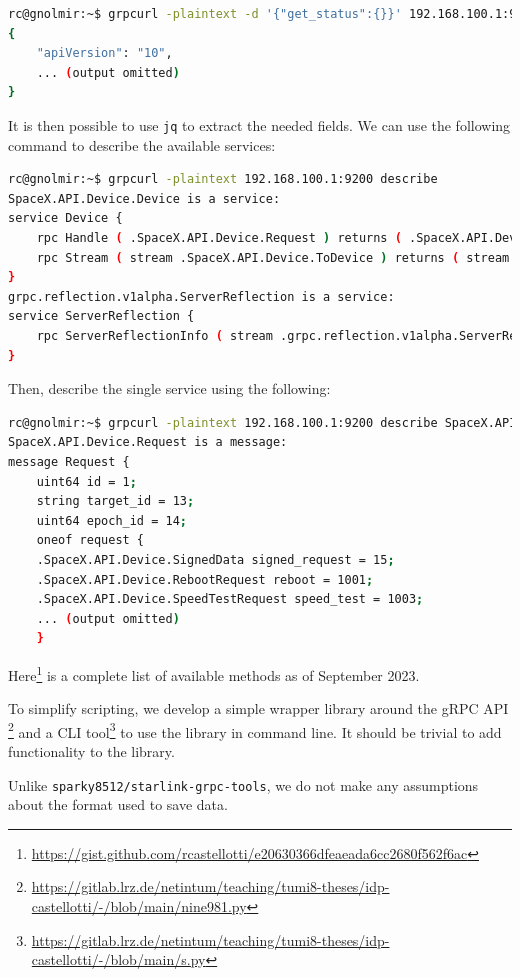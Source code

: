\documentclass[IN,11pt,twoside,openright,idp,english]{tumthesis}
\begin{document}
\begin{lstlisting}[language=bash]
rc@gnolmir:~$ grpcurl -plaintext -d '{"get_status":{}}' 192.168.100.1:9200 SpaceX.API.Device.Device/Handle
{
    "apiVersion": "10",
    ... (output omitted)
}
\end{lstlisting}

It is then possible to use \texttt{jq} to extract the needed fields. We can use the following command to describe the available services:
    
\begin{lstlisting}[language=bash]
rc@gnolmir:~$ grpcurl -plaintext 192.168.100.1:9200 describe
SpaceX.API.Device.Device is a service:
service Device {
    rpc Handle ( .SpaceX.API.Device.Request ) returns ( .SpaceX.API.Device.Response );
    rpc Stream ( stream .SpaceX.API.Device.ToDevice ) returns ( stream .SpaceX.API.Device.FromDevice );
}
grpc.reflection.v1alpha.ServerReflection is a service:
service ServerReflection {
    rpc ServerReflectionInfo ( stream .grpc.reflection.v1alpha.ServerReflectionRequest ) returns ( stream .grpc.reflection.v1alpha.ServerReflectionResponse );
}
\end{lstlisting}
    
Then, describe the single service using the following:
    
\begin{lstlisting}[language=bash]
rc@gnolmir:~$ grpcurl -plaintext 192.168.100.1:9200 describe SpaceX.API.Device.Request
SpaceX.API.Device.Request is a message:
message Request {
    uint64 id = 1;
    string target_id = 13;
    uint64 epoch_id = 14;
    oneof request {
    .SpaceX.API.Device.SignedData signed_request = 15;
    .SpaceX.API.Device.RebootRequest reboot = 1001;
    .SpaceX.API.Device.SpeedTestRequest speed_test = 1003;
    ... (output omitted)
    }
\end{lstlisting}
    
Here\footnote{\url{https://gist.github.com/rcastellotti/e20630366dfeaeada6cc2680f562f6ac}} is a complete list of available methods as of September 2023.

To simplify scripting, we develop a simple wrapper library around the gRPC API \footnote{\url{https://gitlab.lrz.de/netintum/teaching/tumi8-theses/idp-castellotti/-/blob/main/nine981.py}} and a CLI tool\footnote{\url{https://gitlab.lrz.de/netintum/teaching/tumi8-theses/idp-castellotti/-/blob/main/s.py}} to use the library in command line. It should be trivial to add functionality to the library.

Unlike \texttt{sparky8512/starlink-grpc-tools}, we do not make any assumptions about the format used to save data.
\end{document}
